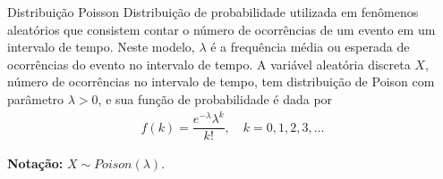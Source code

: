 \documentclass[9pt]{beamer}
\begin{document}
% 
% 
% 
% 
% 
% 
% 

\begin{frame}{Distribuição Poisson}
Distribuição de probabilidade utilizada em fenômenos aleatórios que consistem contar o número de ocorrências de um evento em um intervalo de tempo. Neste modelo, $\lambda$ é a frequência média ou esperada de ocorrências do evento no  intervalo de tempo. A variável aleatória discreta $X$, número de ocorrências no intervalo de tempo, tem distribuição de Poison com parâmetro $\lambda > 0$, e sua função de probabilidade é dada por
\begin{align*}
f(k) = \dfrac{e^{-\lambda}\lambda^k}{k!}, \quad k =0,1,2,3, \dots
\end{align*}
\vfill

\textbf{Notação:} $X \sim Poison(\lambda)$.
\end{frame}
\end{document}
